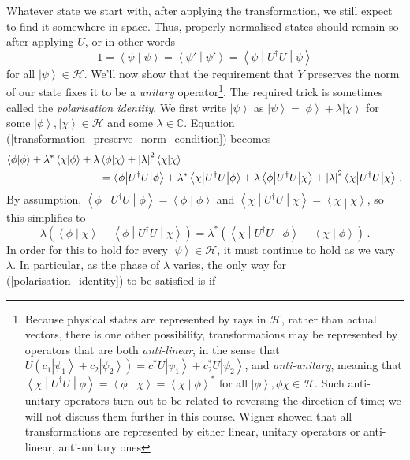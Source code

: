 \documentclass{article}
\theoremstyle{plain}\theoremheaderfont{\normalfont\itshape}\theorembodyfont{\rmfamily}\theoremseparator{.}\newtheorem*{rem}{Remark}\newtheorem*{ex}{Example}\newtheorem*{proof}{Proof}\newtheorem*{altp}{Alternative proof}
\theoremstyle{plain}\theoremheaderfont{\normalfont\bfseries}\theorembodyfont{\rmfamily}\theoremseparator{.}\newtheorem{thm}{Theorem}[section]\newtheorem{lem}[thm]{Lemma}\newtheorem{prop}[thm]{Proposition}\newtheorem*{cor}{Corollary}\newtheorem{defn}[thm]{Definition}\newtheorem{clm}[thm]{Claim}\newtheorem{clminproof}{Claim}
\theoremstyle{break}\theoremheaderfont{\normalfont\itshape}\theorembodyfont{\rmfamily}\theoremseparator{.\medskip}\newtheorem*{proofskip}{Proof}\newtheorem*{exs}{Examples}\newtheorem*{rems}{Remarks}
\theoremstyle{break}\theoremheaderfont{\normalfont\bfseries}\theorembodyfont{\rmfamily}\theoremseparator{.\medskip}\newtheorem{lemskip}[thm]{Lemma}\newtheorem{defnskip}[thm]{Definition}\newtheorem{propskip}[thm]{Proposition}\newtheorem{thmskip}[thm]{Theorem}
\numberwithin{equation}{section}
\newcommand{\ket}[1]{\left| #1 \right\rangle}
\newcommand{\braket}[2]{\left\langle #1 \middle| #2 \right\rangle}
\newcommand{\mel}[3]{\left\langle #1 \middle| #2 \middle| #3 \right\rangle}
\newcommand{\expval}[2]{\left\langle #2 \middle| #1 \middle| #2 \right\rangle}
\newcommand{\abs}[1]{\left| #1 \right|}
\newcommand{\hb}{\mathcal{H}}
\newcommand{\CC}{\mathbb{C}}
\begin{document}
    Whatever state we start with, after applying the transformation, we still expect to find it somewhere in space. Thus, properly normalised states should remain so after applying \(U\), or in other words
    \begin{equation}\label{transformation_preserve_norm_condition}
        1=\braket{\psi}{\psi}=\braket{\psi'}{\psi'}=\expval{U^\dagger U}{\psi}
    \end{equation}
    for all \(\ket{\psi}\in\hb\). We'll now show that the requirement that \(Y\) preserves the norm of our state fixes it to be a \textit{unitary} operator\footnote{Because physical states are represented by rays in \(\hb\), rather than actual vectors, there is one other possibility, transformations may be represented by operators that are both \textit{anti-linear}, in the sense that \(U(c_1\ket{\psi_1}+c_2\ket{\psi_2})=c_1^*U\ket{\psi_1}+c_2^*U\ket{\psi_2}\), and \textit{anti-unitary}, meaning that \(\mel{\chi}{U^\dagger U}{\phi}=\braket{\phi}{\chi}=\braket{\chi}{\phi}^*\) for all \(\ket{\phi},\phi{\chi}\in\hb\). Such anti-unitary operators turn out to be related to reversing the direction of time; we will not discuss them further in this course. Wigner showed that all transformations are represented by either linear, unitary operators or anti-linear, anti-unitary ones}. The required trick is sometimes called the \textit{polarisation identity}. We first write \(\ket{\psi}\) as \(\ket{\psi}=\ket{\phi}+\lambda\ket{\chi}\) for some \(\ket{\phi},\ket{\chi}\in\hb\) and some \(\lambda\in\CC\). Equation (\ref{transformation_preserve_norm_condition}) becomes
    \begin{align}
        \braket{\phi}{\phi}+\lambda^*\braket{\chi}{\phi}+\lambda&\braket{\phi}{\chi}+\abs{\lambda}^2\braket{\chi}{\chi}\notag\\
        &=\expval{U^\dagger U}{\phi}+\lambda^*\mel{\chi}{U^\dagger U}{\phi}+\lambda\mel{\phi}{U^\dagger U}{\chi}+\abs{\lambda}^2\expval{U^\dagger U}{\chi}\,.
    \end{align}
    By assumption, \(\expval{U^\dagger U}{\phi}=\braket{\phi}{\phi}\) and \(\expval{U^\dagger U}{\chi}=\braket{\chi}{\chi}\), so this simplifies to
    \begin{equation}\label{polarisation_identity}
        \lambda\left(\braket{\phi}{\chi}-\mel{\phi}{U^\dagger U}{\chi}\right)=\lambda^*\left(\mel{\chi}{U^\dagger U}{\phi}-\braket{\chi}{\phi}\right)\,.
    \end{equation}
    In order for this to hold for every \(\ket{\psi}\in\hb\), it must continue to hold as we vary \(\lambda\). In particular, as the phase of \(\lambda\) varies, the only way for (\ref{polarisation_identity}) to be satisfied is if
\end{document}
